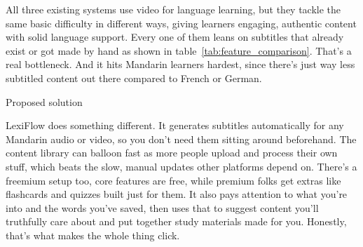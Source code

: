 All three existing systems use video for language learning, but they tackle the same basic difficulty in different ways, giving learners engaging, authentic content with solid language support. Every one of them leans on subtitles that already exist or got made by hand {as shown in table~{\ref{tab:feature_comparison}}}. That's a real bottleneck. And it hits Mandarin learners hardest, since there's just way less subtitled content out there compared to French or German. \begin{table}[h]
    \centering
    \caption{Language Learning Platform Feature Comparison}
    \label{tab:feature_comparison}

    \begin{flushleft}
        \small * Proposed solution
    \end{flushleft}
\end{table} LexiFlow does something different. It generates subtitles automatically for any Mandarin audio or video, so you don't need them sitting around beforehand. The content library can balloon fast as more people upload and process their own stuff, which beats the slow, manual updates other platforms depend on. There's a freemium setup too, core features are free, while premium folks get extras like flashcards and quizzes built just for them. It also pays attention to what you're into and the words you've saved, then uses that to suggest content you'll truthfully care about and put together study materials made for you. Honestly, that's what makes the whole thing click.
